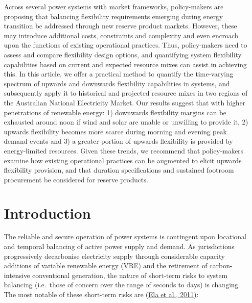 \documentclass[12pt,a4paper,]{report}
\begin{document}
Across several power systems with market frameworks, policy-makers are
proposing that balancing flexibility requirements emerging during energy
transition be addressed through new reserve product markets. However,
these may introduce additional costs, constraints and complexity and
even encroach upon the functions of existing operational practices.
Thus, policy-makers need to assess and compare flexibility design
options, and quantifying system flexibility capabilities based on
current and expected resource mixes can assist in achieving this. In
this article, we offer a practical method to quantify the time-varying
spectrum of upwards and downwards flexibility capabilities in systems,
and subsequently apply it to historical and projected resource mixes in
two regions of the Australian National Electricity Market. Our results
suggest that with higher penetrations of renewable energy: 1) downwards
flexibility margins can be exhausted around noon if wind and solar are
unable or unwilling to provide it, 2) upwards flexibility becomes more
scarce during morning and evening peak demand events and 3) a greater
portion of upwards flexibility is provided by energy-limited resources.
Given these trends, we recommend that policy-makers examine how existing
operational practices can be augmented to elicit upwards flexibility
provision, and that duration specifications and sustained footroom
procurement be considered for reserve products.

\hypertarget{introduction-1}{%
\section{Introduction}\label{introduction-1}}

The reliable and secure operation of power systems is contingent upon
locational and temporal balancing of active power supply and demand. As
jurisdictions progressively decarbonise electricity supply through
considerable capacity additions of variable renewable energy (VRE) and
the retirement of carbon-intensive conventional generation, the nature
of short-term risks to system balancing (i.e.~those of concern over the
range of seconds to days) is changing. The most notable of these
short-term risks are
(\protect\hyperlink{ref-elaOperatingReservesVariable2011}{Ela et al.,
2011}):
\end{document}
